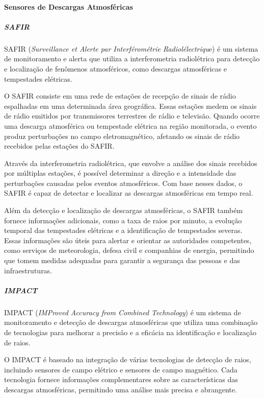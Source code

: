 \documentclass[a4paper, 12pt, onecolumn,singlespacing]{article}
\begin{document}
	\paragraph{Sensores de Descargas Atmosféricas}
	
	\subparagraph{SAFIR}
	
	SAFIR (\textit{Surveillance et Alerte par Interférométrie Radiolélectriqu}e) é um sistema de monitoramento e alerta que utiliza a interferometria radiolétrica para detecção e localização de fenômenos atmosféricos, como descargas atmosféricas e tempestades elétricas.
	
	O SAFIR consiste em uma rede de estações de recepção de sinais de rádio espalhadas em uma determinada área geográfica. Essas estações medem os sinais de rádio emitidos por transmissores terrestres de rádio e televisão. Quando ocorre uma descarga atmosférica ou tempestade elétrica na região monitorada, o evento produz perturbações no campo eletromagnético, afetando os sinais de rádio recebidos pelas estações do SAFIR.
	
	Através da interferometria radiolétrica, que envolve a análise dos sinais recebidos por múltiplas estações, é possível determinar a direção e a intensidade das perturbações causadas pelos eventos atmosféricos. Com base nesses dados, o SAFIR é capaz de detectar e localizar as descargas atmosféricas em tempo real.
	
	Além da detecção e localização de descargas atmosféricas, o SAFIR também fornece informações adicionais, como a taxa de raios por minuto, a evolução temporal das tempestades elétricas e a identificação de tempestades severas. Essas informações são úteis para alertar e orientar as autoridades competentes, como serviços de meteorologia, defesa civil e companhias de energia, permitindo que tomem medidas adequadas para garantir a segurança das pessoas e das infraestruturas.
	
	\subparagraph{IMPACT}
	
	IMPACT (\textit{IMProved Accuracy from Combined Technology}) é um sistema de monitoramento e detecção de descargas atmosféricas que utiliza uma combinação de tecnologias para melhorar a precisão e a eficácia na identificação e localização de raios.
	
	O IMPACT é baseado na integração de várias tecnologias de detecção de raios, incluindo sensores de campo elétrico e sensores de campo magnético. Cada tecnologia fornece informações complementares sobre as características das descargas atmosféricas, permitindo uma análise mais precisa e abrangente.
	
\end{document}
